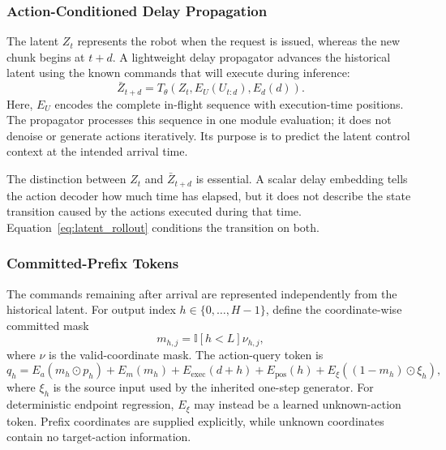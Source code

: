 \subsubsection{Action-Conditioned Delay Propagation}

The latent \(Z_t\) represents the robot when the request is issued, whereas the
new chunk begins at \(t+d\).  A lightweight delay propagator advances the
historical latent using the known commands that will execute during inference:
\begin{equation}
    \bar Z_{t+d}
    =
    T_\theta
    \left(
        Z_t,
        E_U(U_{t:d}),
        E_d(d)
    \right).
    \label{eq:latent_rollout}
\end{equation}
Here, \(E_U\) encodes the complete in-flight sequence with execution-time
positions.  The propagator processes this sequence in one module evaluation;
it does not denoise or generate actions iteratively.  Its purpose is to predict
the latent control context at the intended arrival time.

The distinction between \(Z_t\) and \(\bar Z_{t+d}\) is essential.  A scalar
delay embedding tells the action decoder how much time has elapsed, but it does
not describe the state transition caused by the actions executed during that
time.  Equation~\eqref{eq:latent_rollout} conditions the transition on both.

\subsubsection{Committed-Prefix Tokens}

The commands remaining after arrival are represented independently from the
historical latent.  For output index \(h\in\{0,\ldots,H-1\}\), define the
coordinate-wise committed mask
\begin{equation}
    m_{h,j}
    =
    \mathbb{I}[h<L]\nu_{h,j},
    \label{eq:prefix_mask}
\end{equation}
where \(\nu\) is the valid-coordinate mask.  The action-query token is
\begin{equation}
    q_h
    =
    E_a(m_h\odot p_h)
    +E_m(m_h)
    +E_{\mathrm{exec}}(d+h)
    +E_{\mathrm{pos}}(h)
    +E_\xi((1-m_h)\odot\xi_h),
    \label{eq:action_query}
\end{equation}
where \(\xi_h\) is the source input used by the inherited one-step generator.
For deterministic endpoint regression, \(E_\xi\) may instead be a learned
unknown-action token.  Prefix coordinates are supplied explicitly, while
unknown coordinates contain no target-action information.

